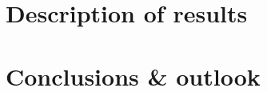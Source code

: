 \documentclass[12pt]{article}
\begin{document}






\section{Description of results}







\section{Conclusions \& outlook}










\end{document}
